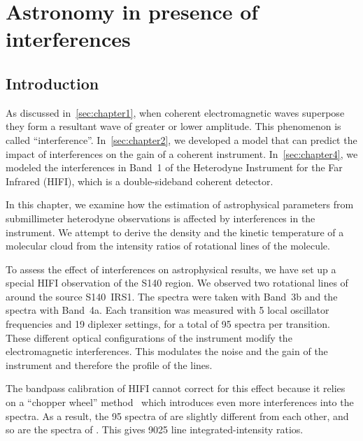 \cleardoublepage
\chapter{Astronomy in presence of interferences}
\label{sec:chapter5}

\section{Introduction}

As discussed in~\cref{sec:chapter1}, when coherent electromagnetic waves superpose they form a resultant wave of greater or lower amplitude.
This phenomenon is called ``interference''.
In~\cref{sec:chapter2}, we developed a model that can predict the impact of interferences on the gain of a coherent instrument.
In~\cref{sec:chapter4}, we modeled the interferences in Band~1 of the Heterodyne Instrument for the Far Infrared (HIFI), which is a double-sideband coherent detector.

In this chapter, we examine how the estimation of astrophysical parameters from submillimeter heterodyne observations is affected by interferences in the instrument.
We attempt to derive the density and the kinetic temperature of a molecular cloud from the intensity ratios of rotational lines of the  molecule.

To assess the effect of interferences on astrophysical results, we have set up a special HIFI observation of the S140 region.
We observed two rotational lines of~ around the source S140~IRS1.
The  spectra were taken with Band~3b and the  spectra with Band~4a.
Each transition was measured with 5 local oscillator frequencies and 19 diplexer settings, for a total of 95 spectra per transition.
These different optical configurations of the instrument modify the electromagnetic interferences.
This modulates the noise and the gain of the instrument and therefore the profile of the lines.

The bandpass calibration of HIFI cannot correct for this effect because it relies on a ``chopper wheel'' method~\parencite{kutner1981recommendations,ossenkopf2002intensity} which introduces even more interferences into the spectra.
As a result, the 95 spectra of  are slightly different from each other, and so are the spectra of .
This gives 9025 line integrated-intensity ratios.

